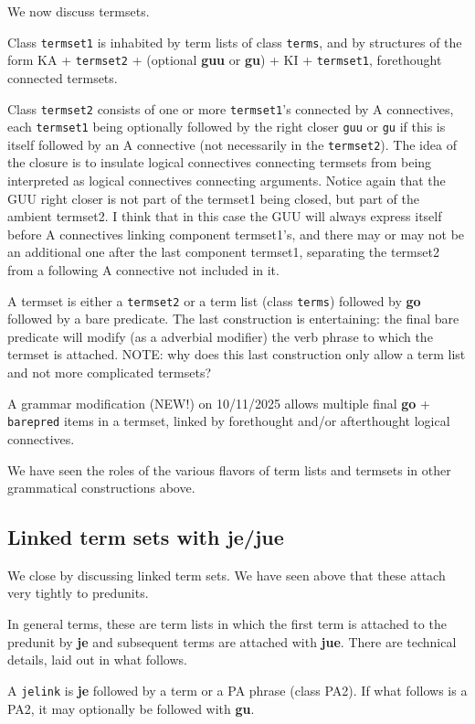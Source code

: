 \documentclass[12pt]{book}
\begin{document}
We now discuss termsets.

Class {\tt termset1} is inhabited by term lists of class {\tt terms}, and by structures of the form KA + {\tt termset2} + (optional {\bf guu} or {\bf gu}) + KI + {\tt termset1}, forethought connected termsets.

Class {\tt termset2} consists of one or more {\tt termset1}'s connected by A connectives, each {\tt termset1} being optionally followed by
the right closer {\tt guu} or {\tt gu} if this is itself followed by an A connective (not necessarily in the {\tt termset2}).  The idea of the closure is to insulate logical connectives connecting termsets
from being interpreted as logical connectives connecting arguments.  Notice again that the GUU right closer is not part of the termset1 being closed,
but part of the ambient termset2.  I think that in this case the GUU will always express itself before A connectives linking component termset1's, and there may or may not be an additional one after the last component termset1, separating the termset2 from a following A connective not included in it.

A termset is either a {\tt termset2} or a term list (class {\tt terms}) followed by {\bf go} followed by a bare predicate.  The last construction is entertaining:  the final bare predicate will modify (as a adverbial modifier)  the verb phrase to which the termset is attached.  NOTE:  why does this last construction only allow a term list and not more complicated termsets?

A grammar modification (NEW!) on 10/11/2025 allows multiple final  {\bf go} + {\tt barepred} items in a termset, linked by forethought and/or afterthought logical connectives.

We have seen the roles of the various flavors of term lists and termsets in other grammatical constructions above.


\subsection{Linked term sets with {\bf je/jue}}

We close by discussing linked term sets.  We have seen above that these attach very tightly to predunits.

In general terms, these are term lists in which the first term is attached to the predunit by {\bf je} and subsequent terms are attached
with {\bf jue}.  There are technical details, laid out in what follows.

A {\tt jelink} is {\bf je} followed by a term or a PA phrase (class PA2).  If what follows is a PA2, it may optionally be followed with {\bf gu}.
\end{document}
